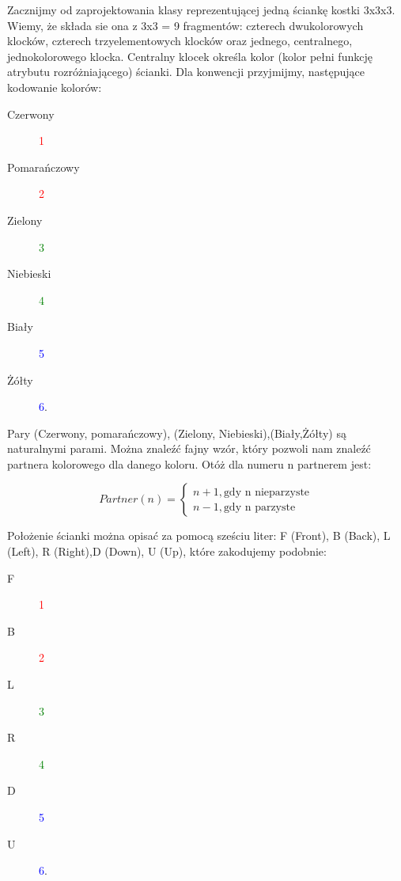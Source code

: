 \documentclass{article}
\begin{document}
Zacznijmy od zaprojektowania  klasy reprezentującej jedną ściankę kostki 3x3x3. Wiemy, że składa sie ona z 3x3 = 9 fragmentów: czterech dwukolorowych klocków, czterech trzyelementowych klocków oraz jednego, centralnego, jednokolorowego klocka. 
Centralny klocek określa kolor (kolor pełni funkcję atrybutu rozróżniającego) ścianki.
Dla konwencji przyjmijmy, następujące kodowanie kolorów:

\begin{description}
\item[Czerwony] \textcolor{red}{1}
\item[Pomarańczowy] \textcolor{red}{2}
\item[Zielony] \textcolor{green}{3}
\item[Niebieski] \textcolor{green}{4}
\item[Biały] \textcolor{blue}{5}
\item[Żółty] \textcolor{blue}{6}.
\end{description}
Pary (Czerwony, pomarańczowy), (Zielony, Niebieski),(Biały,Żółty) są naturalnymi parami.
Można znaleźć fajny wzór, który pozwoli nam znaleźć partnera kolorowego dla danego koloru. Otóż dla numeru n partnerem jest:

\begin{equation}
Partner(n) = \begin{cases}
n+1, \text{gdy n nieparzyste} \\
n-1, \text{gdy n parzyste}

\end{cases}
\end{equation}


Położenie ścianki można opisać za pomocą sześciu liter: F (Front), B (Back), L (Left), R (Right),D (Down), U (Up), które zakodujemy podobnie:
\begin{description}
\item[F] \textcolor{red}{1}
\item[B] \textcolor{red}{2}
\item[L] \textcolor{green}{3}
\item[R] \textcolor{green}{4}
\item[D] \textcolor{blue}{5}
\item[U] \textcolor{blue}{6}. \\
\end{description}
\end{document}
